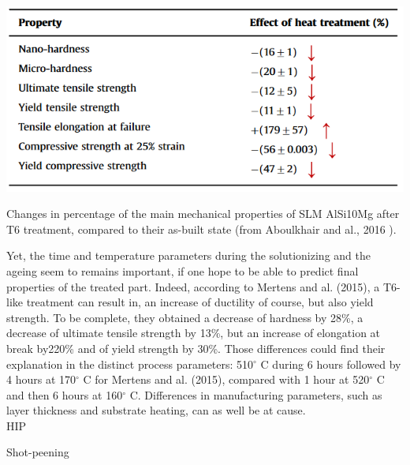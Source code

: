 \begin{table}[ht]
		\centering
			\includegraphics[scale=0.70]{Images/ABvsT6}
			\decoRule
		\caption[Changes in percentage of the main mechanical properties of SLM AlSi10Mg after T6 treatment, , compared to their as-built state] {Changes in percentage of the main mechanical properties of SLM AlSi10Mg after T6 treatment, compared to their as-built state (from Aboulkhair and al., 2016 \parencite{ABOULKHAIR2016139}).}
		\label{tab:ABvsT6}
\end{table}

Yet, the time and temperature parameters during the solutionizing and the ageing seem to remains important, if one hope to be able to predict final properties of the treated part. Indeed, according to Mertens and al. (2015)\cite{Mertens15}, a T6-like treatment can result in, an increase of ductility of course, but also yield strength. To be complete, they obtained a decrease of hardness by 28\%, a decrease of ultimate tensile strength by 13\%, but an increase of elongation at break by220\% and of yield strength by 30\%. Those differences could find their explanation in the distinct process parameters: 510$^\circ$ C during 6 hours followed by 4 hours at 170$^\circ$ C for Mertens and al. (2015)\cite{Mertens15}, compared with 1 hour at 520$^\circ$ C and then 6 hours at 160$^\circ$ C. Differences in manufacturing parameters, such as layer thickness and substrate heating, can as well be at cause.\\

HIP

Shot-peening


